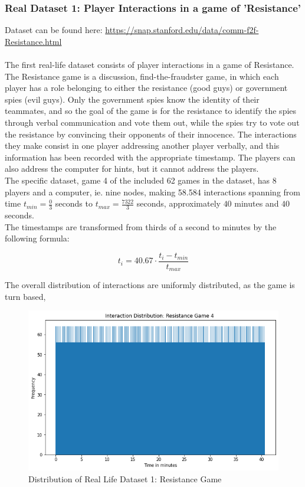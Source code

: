 \subsubsection{Real Dataset 1: Player Interactions in a game of 'Resistance'}
\label{sec:Method:Reproducibility:RealDataset1}
Dataset can be found here: \href{https://snap.stanford.edu/data/comm-f2f-Resistance.html}{https://snap.stanford.edu/data/comm-f2f-Resistance.html}
\\\\
The first real-life dataset consists of player interactions in a game of Resistance.
\\
The Resistance game is a discussion, find-the-fraudster game, in which each player has a role belonging to either the resistance (good guys) or government spies (evil guys).
Only the government spies know the identity of their teammates, and so the goal of the game is for the resistance to identify the spies through verbal communication and vote them out, while the spies try to vote out the resistance by convincing their opponents of their innocence. 
The interactions they make consist in one player addressing another player verbally, and this information has been recorded with the appropriate timestamp. 
The players can also address the computer for hints, but it cannot address the players.
\\
The specific dataset, game 4 of the included 62 games in the dataset, has 8 players and a computer, ie. nine nodes, making 58.584 interactions spanning from time $t_{min} = \frac{0}{3}$ seconds to $t_{max} = \frac{7322}{3}$ seconds, approximately $40$ minutes and $40$ seconds.
\\
The timestamps are transformed from thirds of a second to minutes by the following formula:

\begin{equation}
    t_i = 40.67 \cdot \frac{t_i - t_{min}}{t_{max}}
\end{equation}

The overall distribution of interactions are uniformly distributed, as the game is turn based, 

\begin{figure}[H]
    \centering
    \includegraphics[width=\textwidth]{0_images/real_dataset_1_dist.png}
    \caption{Distribution of Real Life Dataset 1: Resistance Game}
    \label{fig:RLdataset1}
\end{figure}



